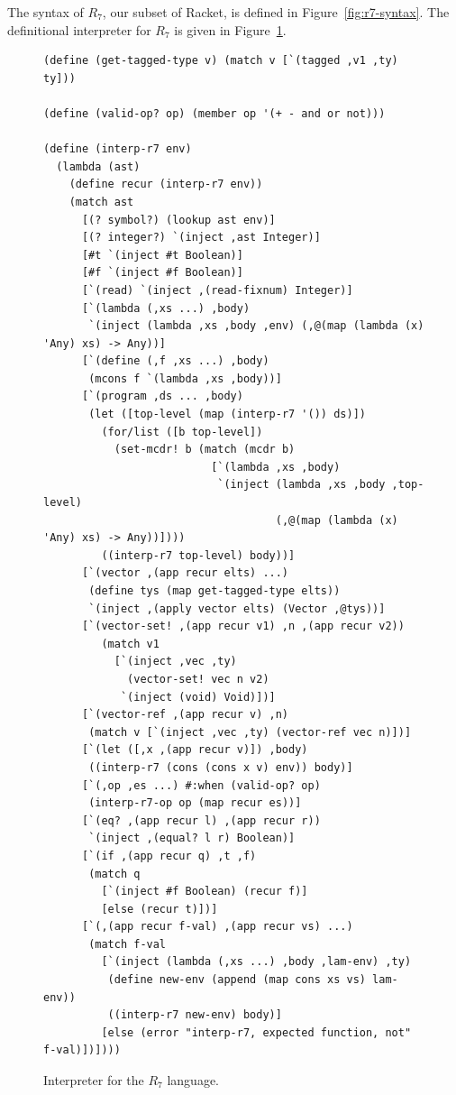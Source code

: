 \documentclass[11pt]{book}
\begin{document}
The syntax of $R_7$, our subset of Racket, is defined in
Figure~\ref{fig:r7-syntax}.
%
The definitional interpreter for $R_7$ is given in
Figure~\ref{fig:interp-R7}.

\begin{figure}[tbp]
\begin{lstlisting}[basicstyle=\ttfamily\footnotesize]
(define (get-tagged-type v) (match v [`(tagged ,v1 ,ty) ty]))

(define (valid-op? op) (member op '(+ - and or not)))

(define (interp-r7 env)
  (lambda (ast)
    (define recur (interp-r7 env))
    (match ast
      [(? symbol?) (lookup ast env)]
      [(? integer?) `(inject ,ast Integer)]
      [#t `(inject #t Boolean)]
      [#f `(inject #f Boolean)]
      [`(read) `(inject ,(read-fixnum) Integer)]
      [`(lambda (,xs ...) ,body)
       `(inject (lambda ,xs ,body ,env) (,@(map (lambda (x) 'Any) xs) -> Any))]
      [`(define (,f ,xs ...) ,body)
       (mcons f `(lambda ,xs ,body))]
      [`(program ,ds ... ,body)
       (let ([top-level (map (interp-r7 '()) ds)])
         (for/list ([b top-level])
           (set-mcdr! b (match (mcdr b)
                          [`(lambda ,xs ,body)
                           `(inject (lambda ,xs ,body ,top-level)
                                    (,@(map (lambda (x) 'Any) xs) -> Any))])))
         ((interp-r7 top-level) body))]
      [`(vector ,(app recur elts) ...)
       (define tys (map get-tagged-type elts))
       `(inject ,(apply vector elts) (Vector ,@tys))]
      [`(vector-set! ,(app recur v1) ,n ,(app recur v2))
         (match v1
           [`(inject ,vec ,ty)
             (vector-set! vec n v2)
            `(inject (void) Void)])]
      [`(vector-ref ,(app recur v) ,n)
       (match v [`(inject ,vec ,ty) (vector-ref vec n)])]
      [`(let ([,x ,(app recur v)]) ,body)
       ((interp-r7 (cons (cons x v) env)) body)]
      [`(,op ,es ...) #:when (valid-op? op)
       (interp-r7-op op (map recur es))]
      [`(eq? ,(app recur l) ,(app recur r))
       `(inject ,(equal? l r) Boolean)]
      [`(if ,(app recur q) ,t ,f)
       (match q
         [`(inject #f Boolean) (recur f)]
         [else (recur t)])]
      [`(,(app recur f-val) ,(app recur vs) ...)
       (match f-val
         [`(inject (lambda (,xs ...) ,body ,lam-env) ,ty)
          (define new-env (append (map cons xs vs) lam-env))
          ((interp-r7 new-env) body)]
         [else (error "interp-r7, expected function, not" f-val)])])))
\end{lstlisting}
\caption{Interpreter for the $R_7$ language.}
\label{fig:interp-R7}
\end{figure}
\end{document}
